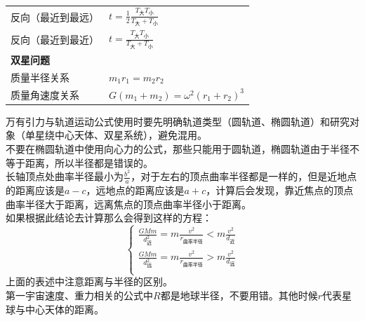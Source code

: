 \begin{tabularx}{\columnwidth}{XX}
  反向（最近到最远） & $t=\frac12\frac{T_{\text{大}}T_{\text{小}}}{T_{\text{大}}+T_{\text{小}}}$ \\
  反向（最近到最近） & $t=\frac{T_{\text{大}}T_{\text{小}}}{T_{\text{大}}+T_{\text{小}}}$        \\
  \multicolumn{2}{l}{\textbf{双星问题}}                                                 \\
  质量半径关系    & $m_1r_1=m_2r_2$                                                       \\
  质量角速度关系   & $G(m_1+m_2)=\omega^2(r_1+r_2)^3$                                      \\
\end{tabularx}

\begin{formulanotebox}
  万有引力与轨道运动公式使用时要先明确轨道类型（圆轨道、椭圆轨道）和研究对象（单星绕中心天体、双星系统），避免混用。\\
  不要在椭圆轨道中使用向心力的公式，那些只能用于圆轨道，椭圆轨道由于半径不等于距离，所以半径都是错误的。\\
  长轴顶点处曲率半径最小为$\frac{b^2}{a}$，对于左右的顶点曲率半径都是一样的，但是近地点的距离应该是$a-c$，远地点的距离应该是$a+c$，计算后会发现，靠近焦点的顶点曲率半径大于距离，远离焦点的顶点曲率半径小于距离。\\
  如果根据此结论去计算那么会得到这样的方程：
  \[
    \left\{
    \begin{aligned}
      \frac{GMm}{d_{\text{近}}^2}=m\frac{v^2}{r_{\text{曲率半径}}}<m\frac{v^2}{d_{\text{近}}} \\
      \frac{GMm}{d_{\text{远}}^2}=m\frac{v^2}{r_{\text{曲率半径}}}>m\frac{v^2}{d_{\text{远}}} \\
    \end{aligned}
    \right.
  \]
  上面的表述中注意距离与半径的区别。\\
  第一宇宙速度、重力相关的公式中$R$都是地球半径，不要用错。其他时候$r$代表星球与中心天体的距离。
\end{formulanotebox}

